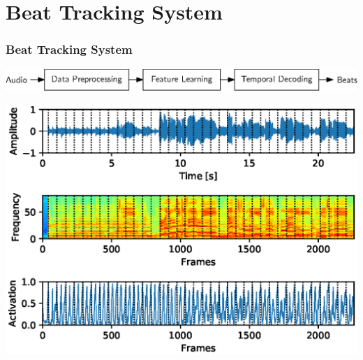 \documentclass{beamer}
\begin{document}
\section{Beat Tracking System}

\begin{frame}
\frametitle{Beat Tracking System}
\begin{minipage}{\textwidth} 
\centering
\includegraphics[scale=0.75]{figures/beat_tracking_system.eps}
\end{minipage}
\vfill
\begin{minipage}{\textwidth} 
\centering
\includegraphics[scale=0.5]{figures/pipeline.eps}
\end{minipage}

\end{frame}
\end{document}
